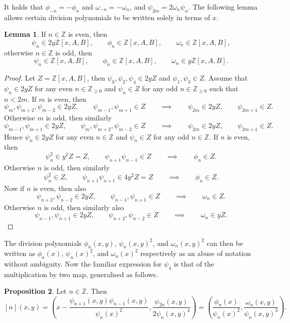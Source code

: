 \documentclass{article}
\newcommand{\Z}{\mathbb{Z}}
\newcommand{\rb}[1]{\left( #1 \right)}
\renewcommand{\sb}[1]{\left[ #1 \right]}
\theoremstyle{definition}\newtheorem*{definition}{Definition}
\theoremstyle{definition}\newtheorem*{example}{Example}
\theoremstyle{definition}\newtheorem*{remark}{Remark}
\newtheorem{proposition}{Proposition}[subsection]
\newtheorem{lemma}[proposition]{Lemma}
\begin{document}
It holds that $ \phi_{-n} = -\phi_n $ and $ \omega_{-n} = -\omega_n $, and $ \psi_{2m} = 2\omega_n\psi_n $. The following lemma allows certain division polynomials to be written solely in terms of $ x $.

\begin{lemma}
If $ n \in \Z $ is even, then
$$ \psi_n \in 2y\Z\sb{x, A, B}, \qquad \phi_n \in \Z\sb{x, A, B}, \qquad \omega_n \in \Z\sb{x, A, B}, $$
otherwise $ n \in \Z $ is odd, then
$$ \psi_n \in \Z\sb{x, A, B}, \qquad \phi_n \in \Z\sb{x, A, B}, \qquad \omega_n \in y\Z\sb{x, A, B}. $$
\end{lemma}

\begin{proof}
Let $ Z = \Z\sb{x, A, B} $, then $ \psi_0, \psi_2, \psi_4 \in 2yZ $ and $ \psi_1, \psi_3 \in Z $. Assume that $ \psi_n \in 2yZ $ for any even $ n \in \Z_{\ge 0} $ and $ \psi_n \in Z $ for any odd $ n \in \Z_{\ge 0} $ such that $ n < 2m $. If $ m $ is even, then
$$ \psi_m, \psi_{m + 2}, \psi_{m - 2} \in 2yZ, \qquad \psi_{m - 1}, \psi_{m + 1} \in Z \qquad \implies \qquad \psi_{2m} \in 2yZ, \qquad \psi_{2m + 1} \in Z. $$
Otherwise $ m $ is odd, then similarly
$$ \psi_{m - 1}, \psi_{m + 1} \in 2yZ, \qquad \psi_m, \psi_{m + 2}, \psi_{m - 2} \in Z \qquad \implies \qquad \psi_{2m} \in 2yZ, \qquad \psi_{2m + 1} \in Z. $$
Hence $ \psi_n \in 2yZ $ for any even $ n \in \Z $ and $ \psi_n \in Z $ for any odd $ n \in \Z $. If $ n $ is even, then
$$ \psi_n^2 \in y^2Z = Z, \qquad \psi_{n + 1}\psi_{n - 1} \in Z \qquad \implies \qquad \phi_n \in Z. $$
Otherwise $ n $ is odd, then similarly
$$ \psi_n^2 \in Z, \qquad \psi_{n + 1}\psi_{n + 1} \in 4y^2Z = Z \qquad \implies \qquad \phi_n \in Z. $$
Now if $ n $ is even, then also
$$ \psi_{n + 2}, \psi_{n - 2} \in 2yZ, \qquad \psi_{n - 1}, \psi_{n + 1} \in Z \qquad \implies \qquad \omega_n \in Z. $$
Otherwise $ n $ is odd, then similarly also
$$ \psi_{n - 1}, \psi_{n + 1} \in 2yZ, \qquad \psi_{n + 2}, \psi_{n - 2} \in Z \qquad \implies \qquad \omega_n \in yZ. $$
\end{proof}

The division polynomials $ \phi_n\rb{x, y} $, $ \psi_n\rb{x, y}^2 $, and $ \omega_n\rb{x, y}^2 $ can then be written as $ \phi_n\rb{x} $, $ \psi_n\rb{x}^2 $, and $ \omega_n\rb{x}^2 $ respectively as an abuse of notation without ambiguity. Now the familiar expression for $ \psi_4 $ is that of the multiplication by two map, generalised as follows.

\begin{proposition}
Let $ n \in \Z $. Then
$$ \sb{n}\rb{x, y} = \rb{x - \dfrac{\psi_{n + 1}\rb{x, y}\psi_{n - 1}\rb{x, y}}{\psi_n\rb{x}^2}, \dfrac{\psi_{2n}\rb{x, y}}{2\psi_n\rb{x, y}^4}} = \rb{\dfrac{\phi_n\rb{x}}{\psi_n\rb{x}^2}, \dfrac{\omega_n\rb{x, y}}{\psi_n\rb{x, y}^3}}. $$
\end{proposition}
\end{document}

